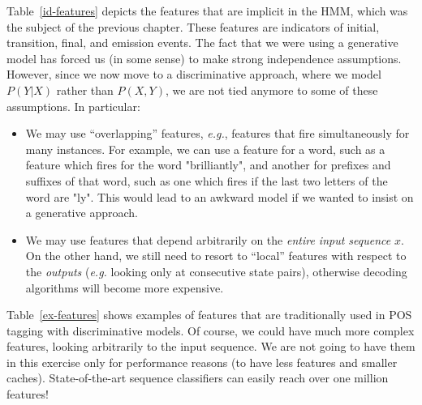 Table~\ref{id-features} depicts the features that are implicit in the HMM, which was the subject of 
the previous chapter. These features are indicators of initial, transition, final, and emission events. 
The fact that we were using a generative model has forced us (in some sense) to 
make strong independence assumptions. 
However, since we now move to a discriminative approach, where we model $P(Y|X)$ rather than $P(X,Y)$, we are not tied anymore to 
some of these assumptions. In particular: 
\begin{itemize}
\item We may use ``overlapping'' features, \emph{e.g.}, features that fire simultaneously for many instances. 
For example, we can use a feature for a word, such as a feature which fires for the word "brilliantly", and another for prefixes and suffixes of that word, such as one which fires if the last two letters of the word are "ly".
This would lead to an awkward model if we wanted to insist on a generative approach. 
\item We may use features that depend arbitrarily on the \emph{entire input sequence} $x$. On the other hand, 
we still need to resort to ``local'' features with respect to the \emph{outputs} (\emph{e.g.} looking only at consecutive state pairs), 
otherwise decoding algorithms will become more expensive.  
\end{itemize}
Table~\ref{ex-features} shows examples of features that are traditionally used in POS tagging with discriminative models.  
Of course, we could have much more complex features, looking arbitrarily to 
the input sequence. We are not going to have them in this
exercise only for performance reasons (to have less features and smaller caches). State-of-the-art sequence classifiers can easily reach over one million features!

